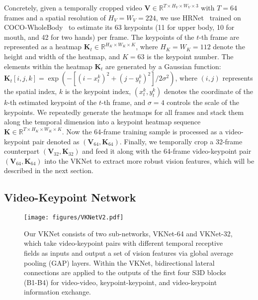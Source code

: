 \documentclass[10pt,twocolumn,letterpaper]{article}
\def \mbb{\mathbb}
\begin{document}
Concretely, given a temporally cropped video $\boldsymbol{V} \in \mbb{R}^{T\times H_{V} \times W_{V} \times 3}$ with $T=64$ frames \cite{li2020transferring} and a spatial resolution of $H_V=W_V=224$, we use HRNet~\cite{sun2019deep} trained on COCO-WholeBody~\cite{jin2020whole} to estimate its 63 keypoints (11 for upper body, 10 for mouth, and 42 for two hands) per frame. The keypoints of the $t$-th frame are represented as a heatmap $\boldsymbol{K}_t\in\mathbb{R}^{H_K \times W_K \times K}$, where $H_K=W_K=112$ denote the height and width of the heatmap, and $K=63$ is the keypoint number. The elements within the heatmap $\boldsymbol{K}_t$ are generated by a Gaussian function: $\boldsymbol{K}_t[i,j,k] = \exp (-[(i-x_t^k)^2 + (j-y_t^k)^2] / 2\sigma^2)$, where $(i, j)$ represents the spatial index, $k$ is the keypoint index, $(x_t^k, y_t^k)$ denotes the coordinate of the $k$-th estimated keypoint of the $t$-th frame, and $\sigma=4$ controls the scale of the keypoints. We repeatedly generate the heatmaps for all frames and stack them along the temporal dimension into a keypoint heatmap sequence $\boldsymbol{K} \in \mathbb{R}^{T \times H_K \times W_K \times K}$. Now the 64-frame training sample is processed as a video-keypoint pair denoted as $(\boldsymbol{V}_{64}, \boldsymbol{K}_{64})$. Finally, we temporally crop a 32-frame counterpart $(\boldsymbol{V}_{32}, \boldsymbol{K}_{32})$ and feed it along with the 64-frame video-keypoint pair $(\boldsymbol{V}_{64}, \boldsymbol{K}_{64})$ into the VKNet to extract more robust vision features, which will be described in the next section.



\subsection{Video-Keypoint Network}
\label{sec:vknet}
\begin{figure}[t]
\centering
\texttt{[image: figures/VKNetV2.pdf]}
\vspace{-7mm}
\caption{Our VKNet consists of two sub-networks, VKNet-64 and VKNet-32, which take video-keypoint pairs with different temporal receptive fields as inputs and output a set of vision features via global average pooling (GAP) layers. Within the VKNet, bidirectional lateral connections \cite{duan2022revisiting} are applied to the outputs of the first four S3D blocks (B1-B4) for video-video, keypoint-keypoint, and video-keypoint information exchange.}
\vspace{-5mm}
\label{fig:vknet}
\end{figure}
\end{document}
